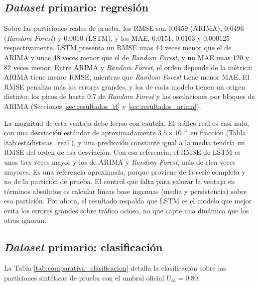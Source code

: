\documentclass[12pt]{report}
\begin{document}
\subsection*{\textit{Dataset} primario: regresión}

Sobre las particiones reales de prueba, los RMSE son 0.0459 (ARIMA), 0.0496 (\textit{Random Forest}) y 0.0010 (LSTM), y los MAE, 0.0151, 0.0103 y 0.000125 respectivamente. LSTM presenta un RMSE unas 44 veces menor que el de ARIMA y unas 48 veces menor que el de \textit{Random Forest}, y un MAE unas 120 y 82 veces menor. Entre ARIMA y \textit{Random Forest}, el orden depende de la métrica: ARIMA tiene menor RMSE, mientras que \textit{Random Forest} tiene menor MAE. El RMSE penaliza más los errores grandes, y los de cada modelo tienen un origen distinto: los picos de hasta 0.7 de \textit{Random Forest} y las oscilaciones por bloques de ARIMA (Secciones \ref{sec:resultados_rf} y \ref{sec:resultados_arima}).

La magnitud de esta ventaja debe leerse con cautela. El tráfico real es casi nulo, con una desviación estándar de aproximadamente $3.5 \times 10^{-4}$ en fracción (Tabla \ref{tab:estadisticas_real}), y una predicción constante igual a la media tendría un RMSE del orden de esa desviación. Con esa referencia, el RMSE de LSTM es unas tres veces mayor y los de ARIMA y \textit{Random Forest}, más de cien veces mayores. Es una referencia aproximada, porque proviene de la serie completa y no de la partición de prueba. El control que falta para valorar la ventaja en términos absolutos es calcular líneas base ingenuas (media y persistencia) sobre esa partición. Por ahora, el resultado respalda que LSTM es el modelo que mejor evita los errores grandes sobre tráfico ocioso, no que capte una dinámica que los otros ignoran.

\subsection*{\textit{Dataset} primario: clasificación}

La Tabla \ref{tab:comparativa_clasificacion} detalla la clasificación sobre las particiones sintéticas de prueba con el umbral oficial $U_{th}=0.80$.
\end{document}
